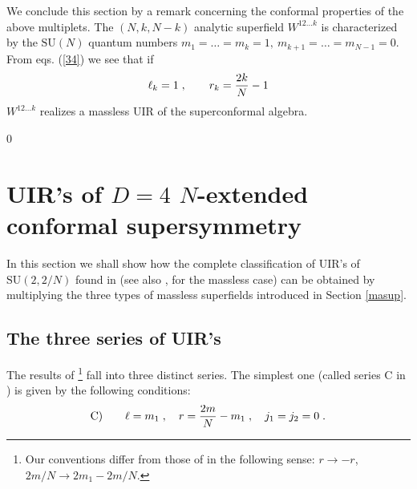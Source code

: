 \documentclass[a4paper,12pt]{article}
\begin{document}
We conclude this section by a remark concerning the conformal 
properties of the above multiplets. The $(N,k,N-k)$ analytic 
superfield $W^{12\ldots k}$ is characterized by the $\mbox{SU}(N)$ 
quantum numbers $m_1=\ldots=m_k=1,\ m_{k+1}=\ldots=m_{N-1}=0$. 
{}From eqs. (\ref{34}) we see that if 
\begin{equation}\label{rch}
 \ell_k=1\;, \qquad r_k={2k\over N}-1
\end{equation}
$W^{12\ldots k}$ realizes a massless UIR of the superconformal 
algebra. 

\setcounter{equation}0 
\section{UIR's of $D=4$ $N$-extended conformal 
supersymmetry}\label{sect5} 

In this section we shall show how the complete classification of 
UIR's of $\mbox{SU}(2,2/N)$ found in \cite{dp} (see also 
\cite{mss}, \cite{bin} for the massless case) can be obtained by 
multiplying the three types of massless superfields introduced in 
Section \ref{masup}. 

\subsection{The three series of UIR's}\label{3ser} 

The results of \cite{dp} \footnote{Our conventions differ from 
those of \cite{dp} in the following sense: $r\rightarrow -r$, 
${2m/ N}\rightarrow 2m_1-{2m/ N}$.} fall into three distinct 
series. The simplest one (called series C in \cite{FS1}) is given 
by the following conditions: 
\begin{equation}\label{C}
  {\rm C)}\qquad \ell = m_1\;, \quad r={2m\over N}-m_1\;, \quad j_1=j_2=0\;. 
\end{equation} 
\end{document}
